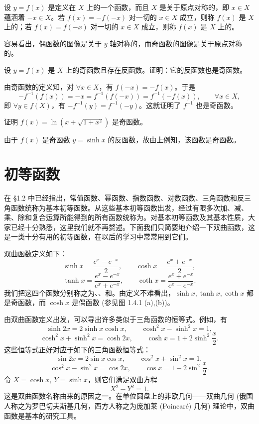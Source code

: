 \documentclass[UTF8,12pt,a4paper,fontset=fandol]{ctexbook}
\begin{document}
设 $y=f(x)$ 是定义在 $X$ 上的一个函数，而且 $X$ 是关于原点对称的，即 $x\in X$ 蕴涵着 $-x\in X$。若 $f(x)=-f(-x)$ 对一切的 $x\in X$ 成立，则称 $f(x)$ 是 $X$ 上的；若 $f(x)=f(-x)$ 对一切的 $x\in X$ 成立，则称 $f(x)$ 是 $X$ 上的。

容易看出，偶函数的图像是关于 $y$ 轴对称的，而奇函数的图像是关于原点对称的。

\noindent{}\quad 设 $y=f(x)$ 是 $X$ 上的奇函数且存在反函数。证明：它的反函数也是奇函数。

\noindent{}\quad 由奇函数的定义知，对 $\forall x\in X$，有 $f(-x)=-f(x)$。于是
\[
  -f^{-1}(f(x))=-x=f^{-1}(f(-x))=f^{-1}(-f(x)),\qquad \forall x\in X,
\]
即 $\forall y\in f(X)$，有 $-f^{-1}(y)=f^{-1}(-y)$。这就证明了 $f^{-1}$ 也是奇函数。

\noindent{}\quad 证明 $f(x)=\ln(x+\sqrt{1+x^2})$ 是奇函数。

\noindent{}\quad 由于 $f(x)$ 是奇函数 $y=\sinh x$ 的反函数，故由上例知，该函数是奇函数。

\section{初等函数}

在 §1.2 中已经指出，常值函数、幂函数、指数函数、对数函数、三角函数和反三角函数统称为基本初等函数。从这些基本初等函数出发，经过有限多次加、减、乘、除和复合运算所能得到的所有函数统称为。对基本初等函数及其基本性质，大家已经十分熟悉，这里我们就不再赘述。下面我们只简要地介绍一下双曲函数，这是一类十分有用的初等函数，在以后的学习中常常用到它们。

双曲函数定义如下：
\[
  \sinh x=\frac{e^x-e^{-x}}{2},\qquad
  \cosh x=\frac{e^x+e^{-x}}{2},
\]
\[
  \tanh x=\frac{e^x-e^{-x}}{e^x+e^{-x}},\qquad
  \coth x=\frac{e^x+e^{-x}}{e^x-e^{-x}}.
\]
我们把这四个函数分别称之为、、和。由定义不难看出，$\sinh x,\tanh x,\coth x$ 都是奇函数，而 $\cosh x$ 是偶函数 (参见图 1.4.1 (a),(b))。

由双曲函数定义出发，可以导出许多类似于三角函数的恒等式。例如，有
\[
  \sinh 2x=2\sinh x\cosh x,\qquad
  \cosh^2x-\sinh^2x=1,
\]
\[
  \cosh^2x+\sinh^2x=\cosh 2x,\qquad
  \cosh x=1+2\sinh^2\frac x2.
\]
这些恒等式正好对应于如下的三角函数恒等式：
\[
  \sin 2x=2\sin x\cos x,\qquad
  \cos^2x+\sin^2x=1,
\]
\[
  \cos^2x-\sin^2x=\cos 2x,\qquad
  \cos x=1-2\sin^2\frac x2.
\]
令 $X=\cosh x,\ Y=\sinh x$，则它们满足双曲方程
\[
  X^2-Y^2=1.
\]
这是双曲函数名称由来的原因之一。在单位圆盘上的非欧几何——双曲几何 (俄国人称之为罗巴切夫斯基几何，西方人称之为庞加莱 (Poincaré) 几何) 理论中，双曲函数是基本的研究工具。
\end{document}
